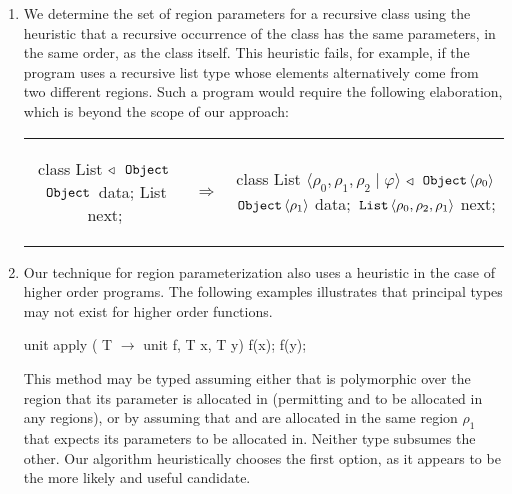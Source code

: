 \begin{enumerate}
\item We determine the set of region parameters for a recursive class
using the heuristic that a recursive occurrence of the class has
the same parameters, in the same order, as the class itself.
This heuristic fails, for example, if the program uses a recursive list type whose
elements alternatively come from two different regions. Such a program would require
the following elaboration, which is beyond the scope of our approach:

\begin{tabular}{ccc}
\begin{minipage}{0.35\linewidth}
\begin{codejava}
class List $\triangleleft$ $\,{\tt Object}\,$
{
  $\,{\tt Object}\,$ data;
  List next;
}
\end{codejava}
\end{minipage}
&
$\Rightarrow$
&
\begin{minipage}{0.65\linewidth}
\begin{codejava}
class List $\langle \rho_0, \rho_1, \rho_2 \; | \; \varphi \rangle$ $\triangleleft$ $\,{\tt Object}\, \langle \rho_0 \rangle$
{
  $\,{\tt Object}\, \langle \rho_1 \rangle$ data;
  $\,{\tt List}\, \langle \rho_0, \rho_2, \rho_1 \rangle$ next;
}
\end{codejava}
\end{minipage}
\end{tabular}

\item Our technique for region parameterization also uses a heuristic in the case of
higher order programs. The following examples illustrates that principal types may
not exist for higher order functions.
\begin{codejava}
    unit apply ( T $\rightarrow$ unit f, T x, T y) { f(x); f(y); }
\end{codejava}
This method may be typed assuming either that  is polymorphic over the region
that its parameter is allocated in (permitting  and  to be allocated in any
regions), or by assuming that  and  are allocated in the same region $\rho_1$
that  expects its parameters to be allocated in. Neither type subsumes the other.
Our algorithm heuristically chooses the first option, as it appears to be the more likely
and useful candidate.



\end{enumerate}
